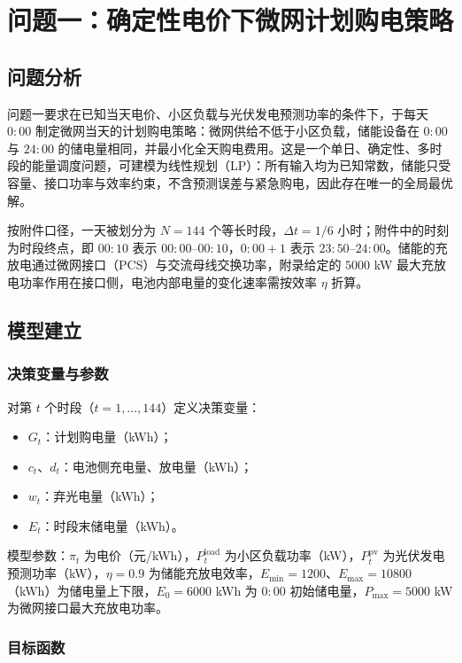 \section{问题一：确定性电价下微网计划购电策略}

\subsection{问题分析}

问题一要求在已知当天电价、小区负载与光伏发电预测功率的条件下，于每天 $0{:}00$ 制定微网当天的计划购电策略：微网供给不低于小区负载，储能设备在 $0{:}00$ 与 $24{:}00$ 的储电量相同，并最小化全天购电费用。这是一个单日、确定性、多时段的能量调度问题，可建模为线性规划（LP）：所有输入均为已知常数，储能只受容量、接口功率与效率约束，不含预测误差与紧急购电，因此存在唯一的全局最优解。

按附件口径，一天被划分为 $N=144$ 个等长时段，$\Delta t=1/6$ 小时；附件中的时刻为时段终点，即 $00{:}10$ 表示 $00{:}00$--$00{:}10$，$0{:}00{+}1$ 表示 $23{:}50$--$24{:}00$。储能的充放电通过微网接口（PCS）与交流母线交换功率，附录给定的 $5000$ kW 最大充放电功率作用在接口侧，电池内部电量的变化速率需按效率 $\eta$ 折算。

\subsection{模型建立}

\subsubsection{决策变量与参数}

对第 $t$ 个时段（$t=1,\dots,144$）定义决策变量：
\begin{itemize}
  \item $G_t$：计划购电量（kWh）；
  \item $c_t$、$d_t$：电池侧充电量、放电量（kWh）；
  \item $w_t$：弃光电量（kWh）；
  \item $E_t$：时段末储电量（kWh）。
\end{itemize}
模型参数：$\pi_t$ 为电价（元/kWh），$P^{\mathrm{load}}_t$ 为小区负载功率（kW），$P^{\mathrm{pv}}_t$ 为光伏发电预测功率（kW），$\eta=0.9$ 为储能充放电效率，$E_{\min}=1200$、$E_{\max}=10800$（kWh）为储电量上下限，$E_0=6000$ kWh 为 $0{:}00$ 初始储电量，$P_{\max}=5000$ kW 为微网接口最大充放电功率。

\subsubsection{目标函数}

